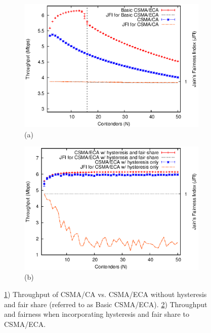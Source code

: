\begin{figure}[htbp]
\centering
\begin{subfigure}{.5\textwidth}
  \centering
  \includegraphics[width=\linewidth]{ECA-vs-CA-FINAL.eps}
  \caption{(a)}
  \label{fig:DCFvsECA}
\end{subfigure}%
\begin{subfigure}{.5\textwidth}
  \centering
  \includegraphics[width=\linewidth]{ECA-w-enhancements-FINAL.eps}
  \caption{(b)}
  \label{fig:ECAPerformace}
\end{subfigure}
\caption{\ref{fig:DCFvsECA}) Throughput of CSMA/CA vs. CSMA/ECA without hysteresis and fair share (referred to as Basic CSMA/ECA). \ref{fig:ECAPerformace}) Throughput and fairness when incorporating hysteresis and fair share to CSMA/ECA.}
\label{fig:INFOCOMPoster}
\end{figure}

